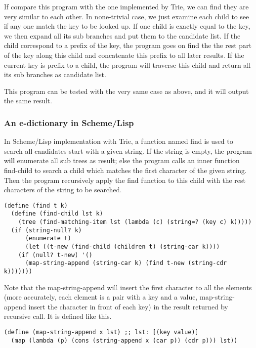 \documentclass{article}
\begin{document}
If compare this program with the one implemented by Trie, we can find they are
very similar to each other. In none-trivial case, we just examine each child
to see if any one match the key to be looked up. If one child is exactly equal
to the key, we then expand all its sub branches and put them to the candidate list.
If the child correspond to a prefix of the key, the program goes on find the
the rest part of the key along this child and concatenate this prefix to all
later results. If the current key is prefix to a child, the program will traverse
this child and return all its sub branches as candidate list.

This program can be tested with the very same case as above, and it will output
the same result.

\subsubsection*{An e-dictionary in Scheme/Lisp}

In Scheme/Lisp implementation with Trie, a function named find is used
to search all candidates start with a given string. If the string is
empty, the program will enumerate all sub trees as result; else the
program calls an inner function find-child to search a child which
matches the first character of the given string. Then the program
recursively apply the find function to this child with the rest
characters of the string to be searched.

\lstset{language=lisp}
\begin{lstlisting}
(define (find t k)
  (define (find-child lst k)
    (tree (find-matching-item lst (lambda (c) (string=? (key c) k)))))
  (if (string-null? k)
      (enumerate t)
      (let ((t-new (find-child (children t) (string-car k))))
	(if (null? t-new) '()
	  (map-string-append (string-car k) (find t-new (string-cdr k)))))))
\end{lstlisting}

Note that the map-string-append will insert the first character to all
the elements (more accurately, each element is a pair with a key and a
value, map-string-append insert the character in front of each key) in
the result returned by recursive call. It is defined like this.

\begin{lstlisting}
(define (map-string-append x lst) ;; lst: [(key value)]
  (map (lambda (p) (cons (string-append x (car p)) (cdr p))) lst))
\end{lstlisting}
\end{document}
